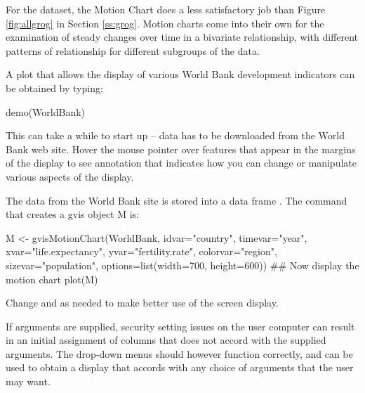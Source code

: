 For the  dataset, the Motion Chart does a less satisfactory
job than Figure \ref{fig:allgrog} in Section \ref{ss:grog}.  Motion
charts come into their own for the examination of steady changes over
time in a bivariate relationship, with different patterns of
relationship for different subgroups of the data.

A plot that allows the display of various World Bank development
indicators can be obtained by typing:
\begin{Schunk}
\begin{Sinput}
demo(WorldBank)
\end{Sinput}
\end{Schunk}
This can take a while to start up -- data has to be downloaded from
the World Bank web site. Hover the mouse pointer over features that
appear in the margins of the display to see annotation that indicates
how you can change or manipulate various aspects of the display.

The data from the World Bank site is stored into a data frame
.  The command that creates a gvis object M
is:
\begin{Schunk}
\begin{Sinput}
M <- gvisMotionChart(WorldBank, idvar="country",
          timevar="year",
          xvar="life.expectancy",
          yvar="fertility.rate",
          colorvar="region", sizevar="population",
          options=list(width=700, height=600))
## Now display the motion chart
plot(M)
\end{Sinput}
\end{Schunk}
Change  and  as needed to make better
use of the screen display.

If arguments are supplied, security setting issues on the user
computer can result in an initial assignment of columns that does not
accord with the supplied arguments.  The drop-down menus should however function
correctly, and can be used to obtain a display that accords with any
choice of arguments that the user may want.

